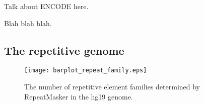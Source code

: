 Talk about ENCODE here.

Blah blah blah.

\subsection{The repetitive genome}

\begin{figure}[h]
  \centering
  \texttt{[image: barplot\_repeat\_family.eps]}
  \caption[Tally of repetitive element families in the hg19 genome]
   {The number of repetitive element families determined by RepeatMasker in the hg19 genome.}
\end{figure}